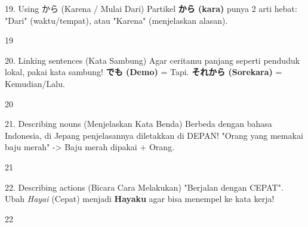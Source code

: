 \begin{lessonbox}{19. Using から (Karena / Mulai Dari)}
    Partikel \textbf{から (kara)} punya 2 arti hebat: "Dari" (waktu/tempat), atau "Karena" (menjelaskan alasan).
\end{lessonbox}
\begin{convobox}{19}
    \noindent

    \vspace{1.5em}
\end{convobox}

\begin{lessonbox}{20. Linking sentences (Kata Sambung)}
    Agar ceritamu panjang seperti penduduk lokal, pakai kata sambung! \textbf{でも (Demo)} = Tapi. \textbf{それから (Sorekara)} = Kemudian/Lalu.
\end{lessonbox}
\begin{convobox}{20}
    \noindent

    \vspace{1.5em}
\end{convobox}

\begin{lessonbox}{21. Describing nouns (Menjelaskan Kata Benda)}
    Berbeda dengan bahasa Indonesia, di Jepang penjelasannya diletakkan di DEPAN! "Orang yang memakai baju merah" -> Baju merah dipakai + Orang.
\end{lessonbox}
\begin{convobox}{21}
    \noindent
      

    \vspace{1.5em}
\end{convobox}

\begin{lessonbox}{22. Describing actions (Bicara Cara Melakukan)}
    "Berjalan dengan CEPAT". Ubah \textit{Hayai} (Cepat) menjadi \textbf{Hayaku} agar bisa menempel ke kata kerja!
\end{lessonbox}
\begin{convobox}{22}
    \noindent

    \vspace{1.5em}
\end{convobox}

